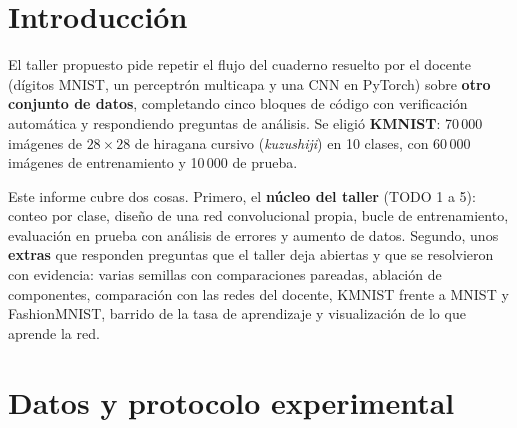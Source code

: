 \documentclass[11pt,letterpaper]{article}
\newcommand{\pts}{\,pts}
\begin{document}
\UDportada
\tableofcontents
\newpage

\section{Introducción}

El taller propuesto pide repetir el flujo del cuaderno resuelto por el docente (dígitos MNIST, un perceptrón multicapa y una
CNN en PyTorch) sobre \textbf{otro conjunto de datos}, completando cinco bloques de código con verificación automática y
respondiendo preguntas de análisis. Se eligió \textbf{KMNIST}: 70\,000 imágenes de $28\times28$ de hiragana cursivo
(\textit{kuzushiji}) en 10 clases, con 60\,000 imágenes de entrenamiento y 10\,000 de prueba.

Este informe cubre dos cosas. Primero, el \textbf{núcleo del taller} (TODO 1 a 5): conteo por clase, diseño de una red
convolucional propia, bucle de entrenamiento, evaluación en prueba con análisis de errores y aumento de datos. Segundo,
unos \textbf{extras} que responden preguntas que el taller deja abiertas y que se resolvieron con evidencia: varias semillas con
comparaciones pareadas, ablación de componentes, comparación con las redes del docente, KMNIST frente a MNIST y FashionMNIST,
barrido de la tasa de aprendizaje y visualización de lo que aprende la red.

\begin{center}
\end{center}

\section{Datos y protocolo experimental}
\end{document}
